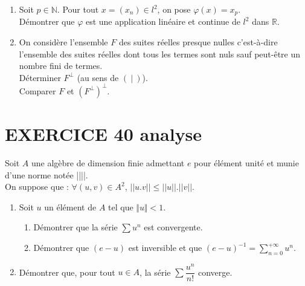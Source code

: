 \documentclass[10pt,oneside]{article}
\begin{document}
\begin{flushleft}
\begin{enumerate}
\begin{enumerate}
  Démontrer que $l^2$ est un sous-espace vectoriel de l'espace vectoriel des suites de nombres réels.\\ 

	\end{enumerate}
	\medskip

Dans la suite de l'exercice, on admet que $(\:|\:)$ est un produit scalaire dans $l^2$.\\
 On suppose que $l^2$ est muni de ce produit scalaire et de la norme euclidienne associée,  notée $||\:||$.\\
\item



Soit  $p\in\mathbb{N}$. Pour tout $x=(x_n)\in l^2$, on pose $\varphi(x)=x_p$.\\
 Démontrer que $\varphi$ est une application linéaire et continue de $l^2$ dans $\mathbb{R}$.
 \item

 On considère l'ensemble $F$ des suites réelles presque nulles c'est-à-dire l'ensemble des suites réelles dont tous les termes sont nuls sauf peut-être un nombre fini de termes.\\
 Déterminer $F^{\perp}$ (au sens de $(\:|\:)$).\\
 Comparer $F$ et $\left( F^{\perp}\right) ^{\perp}$.
\end{enumerate}


\section*{EXERCICE 40 \:analyse }



Soit $A$ une algèbre de dimension finie admettant $e$ pour élément unité et munie d'une norme notée ||\:||.\\
On suppose que : $\forall (u,v)\in A^2$, $||u.v||\leqslant||u||.||v||$.\\

\begin{enumerate}
\item Soit $u$ un élément de $A$ tel que $\Vert u\Vert<1$.
	\begin{enumerate}
	\item Démontrer que la série $\displaystyle\sum u^n$ est convergente.
	\item Démontrer que $(e-u)$ est inversible et que $(e-u)^{-1}=\displaystyle\sum_{n=0}^{+\infty}u^n$.
	\end{enumerate}
\item Démontrer que, pour tout $u\in A$, la série $\displaystyle\sum\dfrac{u^n}{n!}$ converge.



\end{enumerate}
\end{flushleft}
\end{document}
